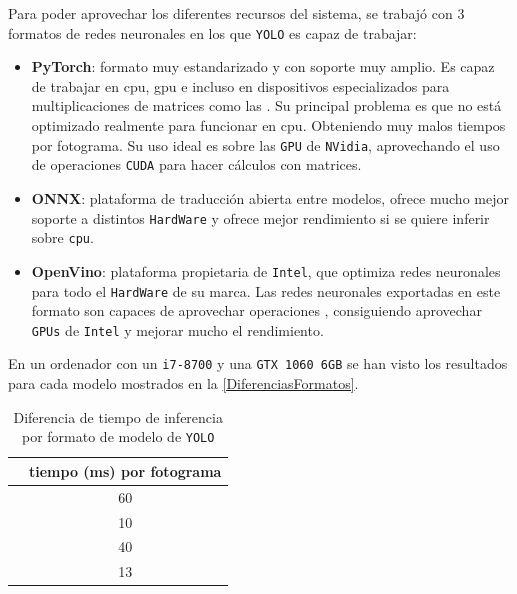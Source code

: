 Para poder aprovechar los diferentes recursos del sistema, se trabajó con 3 formatos de redes neuronales en los que \texttt{YOLO} es capaz de trabajar:
\begin{itemize}
    \item \textbf{PyTorch}: formato muy estandarizado y con soporte muy amplio. Es capaz de trabajar en \acrshort{cpu}, \acrshort{gpu} e incluso en dispositivos especializados para multiplicaciones de matrices como 
    las . Su principal problema es que no está optimizado realmente para funcionar en \acrshort{cpu}. Obteniendo muy malos tiempos por fotograma. Su uso ideal es sobre las \texttt{GPU} de \texttt{NVidia}, 
    aprovechando el uso de operaciones \texttt{CUDA} para hacer cálculos con matrices. 
    \item \textbf{ONNX}: plataforma de traducción abierta entre modelos, ofrece mucho mejor soporte a distintos \texttt{HardWare} y ofrece mejor rendimiento si se quiere inferir sobre \texttt{cpu}.
    \item \textbf{OpenVino}: plataforma propietaria de \texttt{Intel}, que optimiza redes neuronales para todo el \texttt{HardWare} de su marca. Las redes neuronales exportadas en este formato son capaces 
    de aprovechar operaciones \texttt{}, consiguiendo aprovechar \texttt{GPUs} de \texttt{Intel} y mejorar mucho el rendimiento.
\end{itemize}

En un ordenador con un \texttt{i7-8700} y una \texttt{GTX 1060 6GB} se han visto los resultados para cada modelo mostrados en la \autoref{DiferenciasFormatos}.

\begin{table}[H]
    \begin{center} {
    \begin{tabular}{lc}
    \hline
     & \multicolumn{1}{c}{tiempo (ms) por fotograma}\\
    \hline
    \raisebox{0ex}{PyTorch-CPU} & 60 \\[0ex]
    \raisebox{0ex}{PyTorch-CUDA} & 10 \\[0ex]
    \raisebox{0ex}{ONNX} & 40 \\[0ex]
    \raisebox{0ex}{OpenVino} & 13 \\[0ex]
    \hline
    \end{tabular} }
    \end{center}
    \caption{Diferencia de tiempo de inferencia por formato de modelo de \texttt{YOLO}}
    \label{DiferenciasFormatos}
\end{table}

